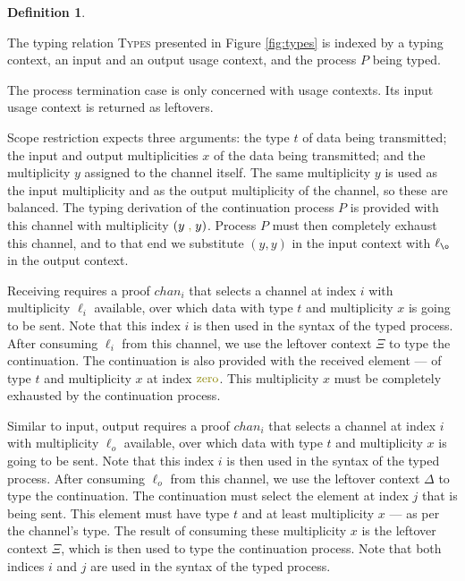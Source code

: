 \documentclass[a4paper,UKenglish,cleveref, autoref, thm-restate,authorcolumns]{lipics-v2019}
\theoremstyle{definition}
\newtheorem{nidefinition}[theorem]{Definition}
\newcommand{\constr}[1]{\textcolor{olive}{\operatorname{#1}}}
\newcommand{\comma}{\; \constr{,} \;}
\begin{document}
\begin{example}
\end{example}

\begin{nidefinition}
  \label{def:types}

  The typing relation \textsc{Types} presented in Figure \ref{fig:types} is indexed by a typing context, an input and an output usage context, and the process $P$ being typed.

  The process termination case is only concerned with usage contexts.
  Its input usage context is returned as leftovers.

  Scope restriction expects three arguments: the type $t$ of data being transmitted; the input and output multiplicities $x$ of the data being transmitted; and the multiplicity $y$ assigned to the channel itself.
  The same multiplicity $y$ is used as the input multiplicity and as the output multiplicity of the channel, so these are balanced.
  The typing derivation of the continuation process $P$ is provided with this channel with multiplicity $(y \comma y)$.
  Process $P$ must then completely exhaust this channel, and to that end we substitute $(y , y)$ in the input context with $\ell_{\o}$ in the output context.

  Receiving requires a proof $chan_i$ that selects a channel at index $i$ with multiplicity $\ell_i$ available, over which data with type $t$ and multiplicity $x$ is going to be sent.
  Note that this index $i$ is then used in the syntax of the typed process.
  After consuming $\ell_i$ from this channel, we use the leftover context $\Xi$ to type the continuation.
  The continuation is also provided with the received element --- of type $t$ and multiplicity $x$ at index $\constr{zero}$.
  This multiplicity $x$ must be completely exhausted by the continuation process.

  Similar to input, output requires a proof $chan_i$ that selects a channel at index $i$ with multiplicity $\ell_o$ available, over which data with type $t$ and multiplicity $x$ is going to be sent.
  Note that this index $i$ is then used in the syntax of the typed process.
  After consuming $\ell_o$ from this channel, we use the leftover context $\Delta$ to type the continuation.
  The continuation must select the element at index $j$ that is being sent.
  This element must have type $t$ and at least multiplicity $x$ --- as per the channel's type.
  The result of consuming these multiplicity $x$ is the leftover context $\Xi$, which is then used to type the continuation process.
  Note that both indices $i$ and $j$ are used in the syntax of the typed process.
  

\end{nidefinition}
\end{document}
